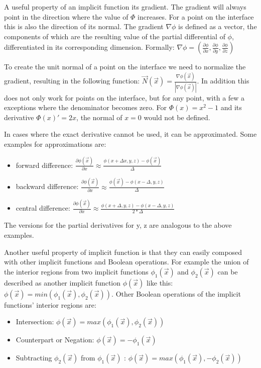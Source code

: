 A useful property of an implicit function its gradient. The gradient will always point in the direction where the value of $\Phi$ increases. For a point on the interface this is also the direction of its normal. The gradient $\nabla\phi$ is defined as a vector, the components of which are the resulting value of the partial differential of $\phi$, differentiated in its corresponding dimension. Formally: $\nabla\phi = (\frac{\partial\phi}{\partial x},\frac{\partial\phi}{\partial y},\frac{\partial\phi}{\partial z})$ 

To create the unit normal of a point on the interface we need to normalize the gradient, resulting in the following function: $\vec{N}(\vec{x}) = \frac{\nabla\phi(\vec{x})}{|\nabla\phi(\vec{x})|}$. In addition this does not only work for points on the interface, but for any point, with a few a exceptions where the denominator becomes zero. For $\Phi(x) = x^2 - 1$ and its derivative $\Phi(x)' = 2x$, the normal of $x = 0$ would not be defined.

In cases where the exact derivative cannot be used, it can be approximated. Some examples for approximations are:
\begin{itemize}
	\item forward difference:  $\frac{\partial\phi(\vec{x})}{\partial x} \approx \frac{\phi(x+\Delta x, y, z) - \phi(\vec{x})}{\Delta}$
	\item backward difference: $\frac{\partial\phi(\vec{x})}{\partial x} \approx \frac{\phi(\vec{x}) - \phi(x-\Delta, y, z)}{\Delta}$
	\item central difference: $\frac{\partial\phi(\vec{x})}{\partial x} \approx \frac{\phi(x+\Delta, y, z) - \phi(x-\Delta, y, z)}{2*\Delta}$
\end{itemize}

The versions for the partial derivatives for y, z are analogous to the above examples.


Another useful property of implicit function is that they can easily composed with other implicit functions and Boolean operations. For example the union of the interior regions from two implicit functions $\phi_1(\vec{x})$ and $\phi_2(\vec{x})$ can be described as another implicit function $\phi(\vec{x})$ like this: $\phi(\vec{x}) = min(\phi_1(\vec{x}), \phi_2(\vec{x}))$. Other Boolean operations of the implicit functions' interior regions are:
 
\begin{itemize}
	\item Intersection:  $\phi(\vec{x}) = max(\phi_1(\vec{x}), \phi_2(\vec{x}))$
	\item Counterpart or Negation: $\phi(\vec{x}) = -\phi_1(\vec{x})$ 
	\item Subtracting $\phi_2(\vec{x})$ from $\phi_1(\vec{x})$ :  $\phi(\vec{x}) = max(\phi_1(\vec{x}), -\phi_2(\vec{x}))$
\end{itemize}




